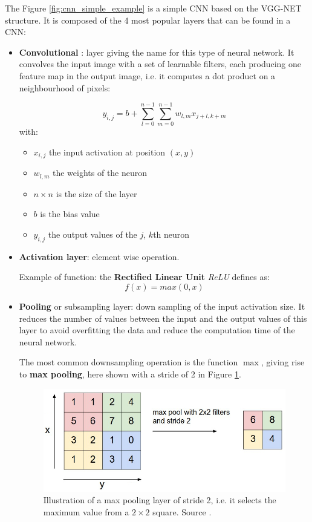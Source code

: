 The Figure \ref{fig:cnn_simple_example} is a simple CNN based on the VGG-NET structure. It is composed of the 4 most popular layers that can be found in a CNN:
\begin{itemize}
    \item \textbf{Convolutional} : layer giving the name for this type of neural network. It convolves the input image with a set of learnable filters, each producing one feature map in the output image, i.e. it computes a dot product on a neighbourhood of pixels:
    
    $$ y_{i, j} = b + \sum_{l=0}^{n - 1} \sum_{m=0}^{n - 1}  w_{l,m} x_{j+l, k+m} $$
    with:
    \begin{itemize}
        \item $x_{i,j}$ the input activation at position $(x, y)$
        \item $w_{l, m}$ the weights of the neuron
        \item $n \times n$ is the size of the layer
        \item $b$ is the bias value
        \item $y_{i, j}$ the output values of the $j$, $k$th neuron
    \end{itemize}
    
    \item \textbf{Activation layer}: element wise operation.
    
    Example of function: the \textbf{Rectified Linear Unit} \textit{ReLU} defines as:
    $$ f(x) = max(0, x)$$
   
    \item \textbf{Pooling} or subsampling layer: down sampling of the input activation size. It reduces the number of values between the input and the output values of this layer to avoid overfitting the data and reduce the computation time of the neural network.
    
    The most common downsampling operation is the function $\max$, giving rise to \textbf{max pooling}, here shown with a stride of 2 in Figure \ref{fig:max_pooling}.
    
    \begin{figure}[h]
        \includegraphics[scale=0.5]{img/max_pooling.jpeg}
        \caption[Illustration of a max pooling layer of stride 2]{Illustration of a max pooling layer of stride 2, i.e. it selects the maximum value from a $2 \times 2$ square. Source \cite{StandfordCourse}.}
        \label{fig:max_pooling}
    \end{figure}
    

\end{itemize}
